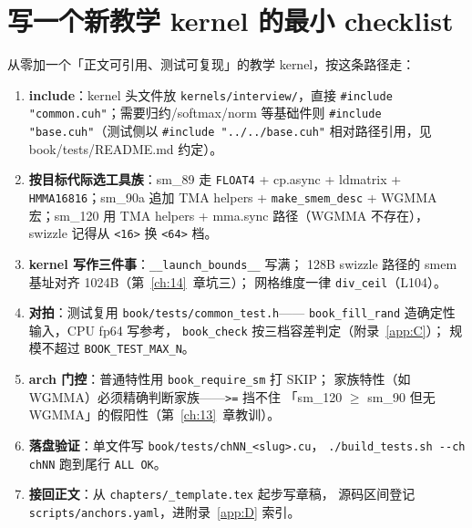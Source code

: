 \section{写一个新教学 kernel 的最小 checklist}

从零加一个「正文可引用、测试可复现」的教学 kernel，按这条路径走：

\begin{enumerate}
  \item \textbf{include}：kernel 头文件放 \texttt{kernels/\allowbreak{}interview/\allowbreak{}}，直接
        \texttt{\#include "common.\allowbreak{}cuh"}；需要归约/softmax/norm 等基础件则
        \texttt{\#include "base.cuh"}（测试侧以 \texttt{\#include ".\allowbreak{}.\allowbreak{}/\allowbreak{}.\allowbreak{}.\allowbreak{}/\allowbreak{}base.\allowbreak{}cuh"}
        相对路径引用，见 book/tests/README.md 约定）。
  \item \textbf{按目标代际选工具族}：sm\_89 走 \texttt{FLOAT4} + cp.async +
        ldmatrix + \texttt{HMMA16816}；sm\_90a 追加 TMA helpers +
        \texttt{make\_\allowbreak{}smem\_\allowbreak{}desc} + WGMMA 宏；sm\_120 用 TMA helpers +
        mma.sync 路径（WGMMA 不存在），swizzle 记得从 \texttt{<16>} 换
        \texttt{<64>} 档。
  \item \textbf{kernel 写作三件事}：\texttt{\_\allowbreak{}\_\allowbreak{}launch\_\allowbreak{}bounds\_\allowbreak{}\_\allowbreak{}} 写满；
        128B swizzle 路径的 smem 基址对齐 1024B（第~\ref{ch:14}~章坑三）；
        网格维度一律 \texttt{div\_ceil}（L104）。
  \item \textbf{对拍}：测试复用 \texttt{book/\allowbreak{}tests/\allowbreak{}common\_\allowbreak{}test.\allowbreak{}h}——
        \texttt{book\_\allowbreak{}fill\_\allowbreak{}rand} 造确定性输入，CPU fp64 写参考，
        \texttt{book\_check} 按三档容差判定（附录~\ref{app:C}）；
        规模不超过 \texttt{BOOK\_\allowbreak{}TEST\_\allowbreak{}MAX\_\allowbreak{}N}。
  \item \textbf{arch 门控}：普通特性用 \texttt{book\_\allowbreak{}require\_\allowbreak{}sm} 打 SKIP；
        家族特性（如 WGMMA）必须精确判断家族——\texttt{>=} 挡不住
        「sm\_120 $\ge$ sm\_90 但无 WGMMA」的假阳性（第~\ref{ch:13}~章教训）。
  \item \textbf{落盘验证}：单文件写 \texttt{book/\allowbreak{}tests/\allowbreak{}ch\allowbreak{}NN\_\allowbreak{}<slug>.\allowbreak{}cu}，
        \texttt{.\allowbreak{}/\allowbreak{}build\_\allowbreak{}tests.\allowbreak{}sh -{}-ch ch\allowbreak{}NN} 跑到尾行 \texttt{ALL OK}。
  \item \textbf{接回正文}：从 \texttt{chapters/\allowbreak{}\_\allowbreak{}template.\allowbreak{}tex} 起步写章稿，
        源码区间登记 \texttt{scripts/\allowbreak{}anchors.\allowbreak{}yaml}，进附录~\ref{app:D} 索引。
\end{enumerate}
